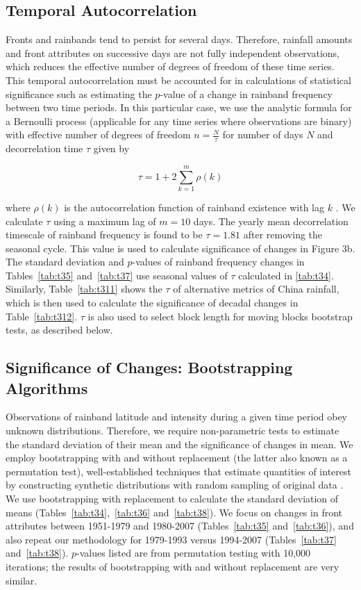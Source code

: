 \documentclass{ametsoc}
\begin{document}
\subsection{Temporal Autocorrelation}

	Fronts and rainbands tend to persist for several days. Therefore, rainfall amounts and front attributes on successive days are not fully independent observations, which reduces the effective number of degrees of freedom of these time series. This temporal autocorrelation must be accounted for in calculations of statistical significance such as estimating the $p$-value of a change in rainband frequency between two time periods. In this particular case, we use the analytic formula for a Bernoulli process (applicable for any time series where observations are binary) with effective number of degrees of freedom $n=\frac{N}{\tau}$ for number of days $N$ and decorrelation time $\tau$ given by

\begin{equation*}
\tau=1+2\sum_{k=1}^m \rho(k)
\end{equation*}

	where $\rho(k)$ is the autocorrelation function of rainband existence with lag $k$ \citep{VonStorch1999}. We calculate $\tau$ using a maximum lag of $m=10$ days. The yearly mean decorrelation timescale of rainband frequency is found to be $\tau = 1.81$ after removing the seasonal cycle. This value is used to calculate significance of changes in Figure 3b. The standard deviation and $p$-values of rainband frequency changes in Tables~\ref{tab:t35} and~\ref{tab:t37} use seasonal values of $\tau$ calculated in \ref{tab:t34}. Similarly, Table~\ref{tab:t311} shows the $\tau$ of alternative metrics of China rainfall, which is then used to calculate the significance of decadal changes in Table~\ref{tab:t312}. $\tau$ is also used to select block length for moving blocks bootstrap tests, as described below.

\subsection{Significance of Changes: Bootstrapping Algorithms}

	Observations of rainband latitude and intensity during a given time period obey unknown distributions. Therefore, we require non-parametric tests to estimate the standard deviation of their mean and the significance of changes in mean. We employ bootstrapping with and without replacement (the latter also known as a permutation test), well-established techniques that estimate quantities of interest by constructing synthetic distributions with random sampling of original data \citep{Good2005}. We use bootstrapping with replacement to calculate the standard deviation of means (Tables~\ref{tab:t34},~\ref{tab:t36} and~\ref{tab:t38}). We focus on changes in front attributes between 1951-1979 and 1980-2007 (Tables~\ref{tab:t35} and~\ref{tab:t36}), and also repeat our methodology for 1979-1993 versus 1994-2007 (Tables~\ref{tab:t37} and~\ref{tab:t38}). $p$-values listed are from permutation testing with 10,000 iterations; the results of bootstrapping with and without replacement are very similar.
	
\end{document}

